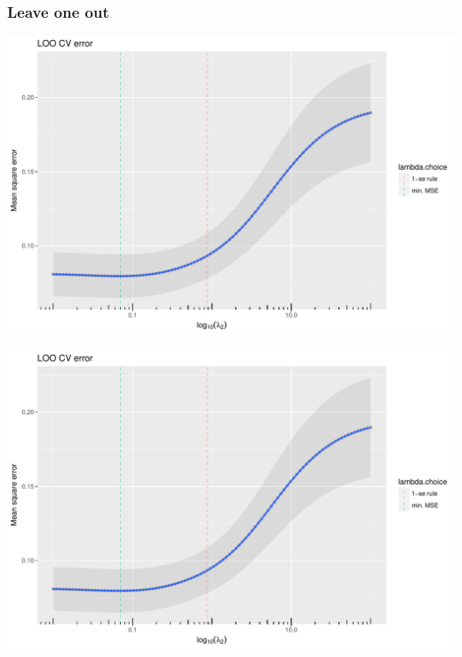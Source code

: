 \documentclass{beamer}\usepackage[]{graphicx}\usepackage[]{color}
\newenvironment{knitrout}{}{} %
\begin{document}
\begin{frame}[containsverbatim]
  \frametitle{Leave one out}
\begin{knitrout}\scriptsize
{}\color{fgcolor}
\includegraphics[width=.8\textwidth]{figures/plot_loo_ridge-1} 

\includegraphics[width=.8\textwidth]{figures/plot_loo_ridge-2} 

\end{knitrout}
\end{frame}
\end{document}
